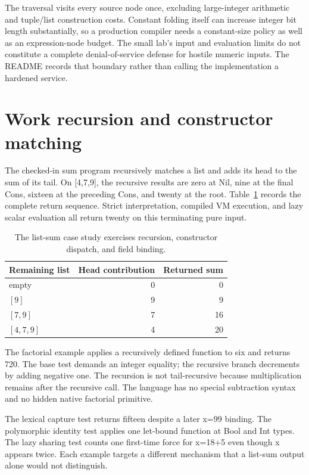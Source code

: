 The traversal visits every source node once, excluding large-integer arithmetic and tuple/list construction costs.
Constant folding itself can increase integer bit length substantially, so a production compiler needs a constant-size policy as well as an expression-node budget.
The small lab's input and evaluation limits do not constitute a complete denial-of-service defense for hostile numeric inputs.
The README records that boundary rather than calling the implementation a hardened service.

\section{Work recursion and constructor matching}
\label{sec:ch93-examples}
The checked-in sum program recursively matches a list and adds its head to the sum of its tail.
On [4,7,9], the recursive results are zero at Nil, nine at the final Cons, sixteen at the preceding Cons, and twenty at the root.
Table~\ref{tab:ch93-sum} records the complete return sequence.
Strict interpretation, compiled VM execution, and lazy scalar evaluation all return twenty on this terminating pure input.

\begin{table}[htbp]
\caption{The list-sum case study exercises recursion, constructor dispatch, and field binding.}
\label{tab:ch93-sum}
\centering
\begin{tabular}{lrr}
\toprule
Remaining list & Head contribution & Returned sum \\
\midrule
empty & 0 & 0 \\
$[9]$ & 9 & 9 \\
$[7,9]$ & 7 & 16 \\
$[4,7,9]$ & 4 & 20 \\
\bottomrule
\end{tabular}
\end{table}

The factorial example applies a recursively defined function to six and returns 720.
The base test demands an integer equality; the recursive branch decrements by adding negative one.
The recursion is not tail-recursive because multiplication remains after the recursive call.
The language has no special subtraction syntax and no hidden native factorial primitive.

The lexical capture test returns fifteen despite a later x=99 binding.
The polymorphic identity test applies one let-bound function at Bool and Int types.
The lazy sharing test counts one first-time force for x=18+5 even though x appears twice.
Each example targets a different mechanism that a list-sum output alone would not distinguish.

